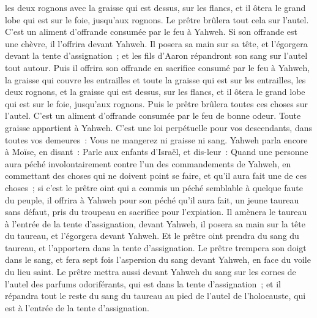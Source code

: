 \begin{multicols}{2}
les deux rognons avec la graisse qui est dessus, sur les flancs, et il ôtera le grand lobe qui est sur le foie, jusqu'aux rognons.
Le prêtre brûlera tout cela sur l'autel. C'est un aliment d'offrande consumée par le feu à Yahweh.
Si son offrande est une chèvre, il l'offrira devant Yahweh.
Il posera sa main sur sa tête, et l'égorgera devant la tente d'assignation~; et les fils d'Aaron répandront son sang sur l'autel tout autour.
Puis il offrira son offrande en sacrifice consumé par le feu à Yahweh, la graisse qui couvre les entrailles et toute la graisse qui est sur les entrailles,
les deux rognons, et la graisse qui est dessus, sur les flancs, et il ôtera le grand lobe qui est sur le foie, jusqu'aux rognons.
Puis le prêtre brûlera toutes ces choses sur l'autel. C'est un aliment d'offrande consumée par le feu de bonne odeur. Toute graisse appartient à Yahweh.
C'est une loi perpétuelle pour vos descendants, dans toutes vos demeures~: Vous ne mangerez ni graisse ni sang.
\VerseOne{}Yahweh parla encore à Moïse, en disant~:
Parle aux enfants d'Israël, et dis-leur~: Quand une personne aura péché involontairement contre l'un des commandements de Yahweh, en commettant des choses qui ne doivent point se faire, et qu'il aura fait une de ces choses~;
 si c'est le prêtre oint qui a commis un péché semblable à quelque faute du peuple, il offrira à Yahweh pour son péché qu'il aura fait, un jeune taureau sans défaut, pris du troupeau en sacrifice pour l'expiation.
Il amènera le taureau à l'entrée de la tente d'assignation, devant Yahweh, il posera sa main sur la tête du taureau, et l'égorgera devant Yahweh.
Et le prêtre oint prendra du sang du taureau, et l'apportera dans la tente d'assignation.
Le prêtre trempera son doigt dans le sang, et fera sept fois l'aspersion du sang devant Yahweh, en face du voile du lieu saint.
Le prêtre mettra aussi devant Yahweh du sang sur les cornes de l'autel des parfums odoriférants, qui est dans la tente d'assignation~; et il répandra tout le reste du sang du taureau au pied de l'autel de l'holocauste, qui est à l'entrée de la tente d'assignation.

\end{multicols}
